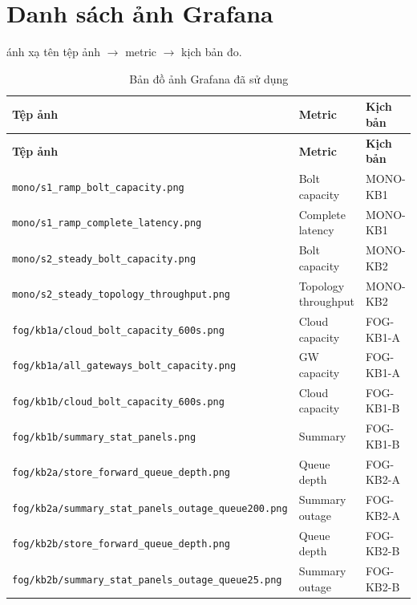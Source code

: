 \documentclass[13pt,a4paper]{report}
\newcommand{\code}[1]{\texttt{\small #1}}
\begin{document}
\chapter{Danh sách ảnh Grafana}
\label{app:images}

 ánh xạ tên tệp ảnh $\to$ metric $\to$ kịch bản đo.

{\scriptsize
\begin{longtable}{p{} p{} p{}}
\caption{Bản đồ ảnh Grafana đã sử dụng}
\label{tab:img-map}\\
\toprule
\textbf{Tệp ảnh} & \textbf{Metric} & \textbf{Kịch bản} \\
\midrule
\endfirsthead
\toprule
\textbf{Tệp ảnh} & \textbf{Metric} & \textbf{Kịch bản} \\
\midrule
\endhead
\code{mono/s1\_ramp\_bolt\_capacity.png}      & Bolt capacity      & MONO-KB1 \\
\code{mono/s1\_ramp\_complete\_latency.png}   & Complete latency   & MONO-KB1 \\
\code{mono/s2\_steady\_bolt\_capacity.png}    & Bolt capacity      & MONO-KB2 \\
\code{mono/s2\_steady\_topology\_throughput.png} & Topology throughput & MONO-KB2 \\
\code{fog/kb1a/cloud\_bolt\_capacity\_600s.png}  & Cloud capacity  & FOG-KB1-A \\
\code{fog/kb1a/all\_gateways\_bolt\_capacity.png}& GW capacity     & FOG-KB1-A \\
\code{fog/kb1b/cloud\_bolt\_capacity\_600s.png}  & Cloud capacity  & FOG-KB1-B \\
\code{fog/kb1b/summary\_stat\_panels.png}        & Summary         & FOG-KB1-B \\
\code{fog/kb2a/store\_forward\_queue\_depth.png} & Queue depth     & FOG-KB2-A \\
\code{fog/kb2a/summary\_stat\_panels\_outage\_queue200.png} & Summary outage & FOG-KB2-A \\
\code{fog/kb2b/store\_forward\_queue\_depth.png} & Queue depth     & FOG-KB2-B \\
\code{fog/kb2b/summary\_stat\_panels\_outage\_queue25.png} & Summary outage & FOG-KB2-B \\
\bottomrule
\end{longtable}
}
\end{document}

